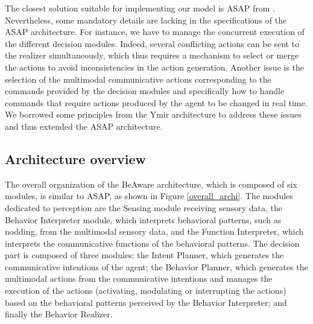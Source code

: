 \documentclass[twocolumn]{svjour3}
\begin{document}
The closest solution suitable for implementing our model is ASAP from \cite{kopp_architecture_2014}.
Nevertheless, some mandatory details are lacking in the specifications of the ASAP architecture. For instance, we have to manage the concurrent execution of the different decision modules. Indeed, several conflicting actions can be sent to the realizer simultaneously, which thus requires a mechanism to select or merge the actions to avoid inconsistencies in the action generation. Another issue is the selection of the multimodal communicative actions corresponding to the commands provided by the decision modules and specifically how to handle commands that require  actions produced by the agent to be changed in real time. 
We borrowed some principles from the Ymir architecture \cite{thorisson_mind_1999} to address these issues and thus extended the ASAP architecture.  

\subsection{Architecture overview}

The overall organization of the BeAware architecture, which is composed of six modules, is similar to ASAP, as shown in Figure \ref{overall_archi}. 
The modules dedicated to  perception are 
the Sensing module receiving sensory data, 
the Behavior Interpreter module, which interprets behavioral patterns, such as nodding, from the multimodal sensory data, 
and the Function Interpreter, which interprets the communicative functions of the behavioral patterns. 
The decision part is composed of three modules:
the Intent Planner, which generates the communicative intentions of the agent; 
the Behavior Planner, which generates the multimodal actions from the communicative intentions and manages the execution of the actions (activating, modulating or interrupting the actions) based on the behavioral patterns perceived by the Behavior Interpreter;
and finally the Behavior Realizer. 
\end{document}

